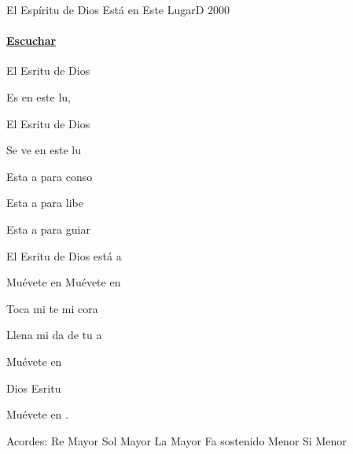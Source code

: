 \documentclass[12pt, spanish]{book}
\begin{document}
    \begin{song}{El Espíritu de Dios Está en Este Lugar}{D}
    {2000} %
    {}
    {} %
    {}
        \ifChordBk
        \paragraph{\mbox{}\hfill\protect\href{https://open.spotify.com/intl-es/track/4x1qjmnKSmIJma1DofbmhY}{Escuchar}\mbox{}\hfill}
        \fi

        \begin{SBOpGroup}
            El Esritu de Dios

            Es en este lu,

            El Esritu de Dios

            Se ve en este lu
        \end{SBOpGroup}

        \begin{SBOpGroup}
            Esta a para conso

            Esta a para libe

            Esta a para guiar

            El Esritu de Dios está a
        \end{SBOpGroup}

        \begin{SBChorus}
            Muévete en  Muévete en 

            Toca mi te mi cora

            Llena mi da de tu a

            Muévete en 

            Dios Esritu

            Muévete en .
        \end{SBChorus}

        \ifChordBk
        \begin{SBOpGroup}
            Acordes:
            \upchord{\D}\qquad Re Mayor \hfill
            \upchord{\G}\qquad Sol Mayor \hfill\null\break
            \upchord{\A}\qquad La Mayor \hfill
            \upchord{\Fsm}Fa sostenido Menor \hfill\null\break
            \upchord{\Bm}\qquad Si Menor \hfill
        \end{SBOpGroup}
        \fi
    \end{song}
\end{document}
